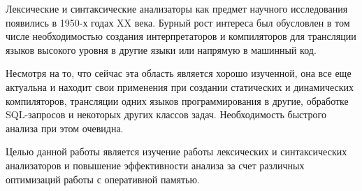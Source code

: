 \documentclass[coursework]{SCWorks}
\begin{document}

\date{2023}

\maketitle


\tableofcontents




\intro
Лексические и синтаксические анализаторы как предмет научного исследования появились в 1950-х годах XX века. Бурный рост интереса был обусловлен в том числе необходимостью создания интерпретаторов и компиляторов для трансляции языков высокого уровня в другие языки или напрямую в машинный код.

Несмотря на то, что сейчас эта область является хорошо изученной, она все еще актуальна и находит свои применения при создании статических и динамических компиляторов, трансляции одних языков программирования в другие, обработке SQL-запросов и некоторых других классов задач\cite{1,2}. Необходимость быстрого анализа при этом очевидна.

Целью данной работы является изучение работы лексических и синтаксических анализаторов и повышение эффективности анализа за счет различных оптимизаций работы с оперативной памятью.
\end{document}
